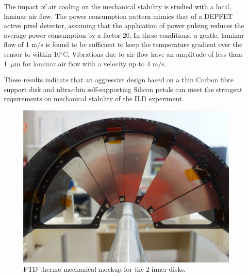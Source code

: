 The impact of air cooling on the mechanical stability is studied with a local, 
laminar air flow. The power consumption pattern mimics that of a DEPFET
active pixel detector, assuming that the application of power pulsing reduces
the average power consumption by a factor 20.
In these conditions, a gentle, laminar flow of 1 $\mathrm{m/s}$ is found to be sufficient
to keep the temperature gradient over the sensor to within 10$^{\circ}$C, 
Vibrations due to air flow have an  amplitude of less than 1~$\mu \mathrm{m}$ 
for laminar air flow with a velocity up to 4 $\mathrm{m/s}$. 

These results indicate that an aggressive design based on a thin Carbon fibre
support disk and ultra-thin self-supporting Silicon petals can meet the 
stringent requirements on mechanical stability of the ILD experiment.





\begin{figure}[t!]
\centering
\includegraphics[width=0.6\hsize]{Detector/fig/FTD_mockup.jpg}
\caption{FTD thermo-mechanical mockup for the 2 inner disks.}
\label{fig:det:FTD_mockup}
\end{figure}


\vspace{2cm}
